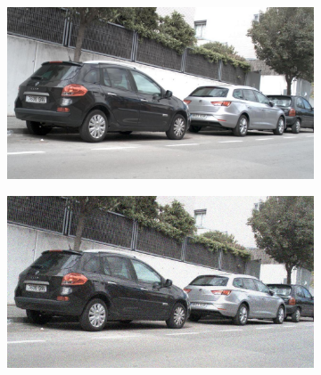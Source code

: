\documentclass[a4paper]{ctexart}
\begin{document}
\begin{figure}[htbp]
\begin{subfigure}{0.08\textwidth}
				\label{fig：Gamma=0.8, Gauss Noise = 1.0}
			\end{subfigure} \\
			
			\vspace{-15pt}
			
			\begin{subfigure}{0.02\textwidth}
				\captionsetup{font=scriptsize}
				\caption*{}
				\vspace{-2pt}
			\end{subfigure}
			\begin{subfigure}{0.08\textwidth}
				\captionsetup{font=scriptsize}
				\includegraphics[width=\linewidth]{picture/Edge Detection/degrade/RGB_001 Gamma=0.9, Gauss Noise=0.0}
				\label{fig: Gamma=0.9, Gauss Noise = 0.0}
			\end{subfigure}
			\begin{subfigure}{0.08\textwidth}
				\captionsetup{font=scriptsize}
				\includegraphics[width=\linewidth]{picture/Edge Detection/degrade/RGB_001 Gamma=0.9, Gauss Noise=0.1}

\end{subfigure}
\end{figure}
\end{document}
